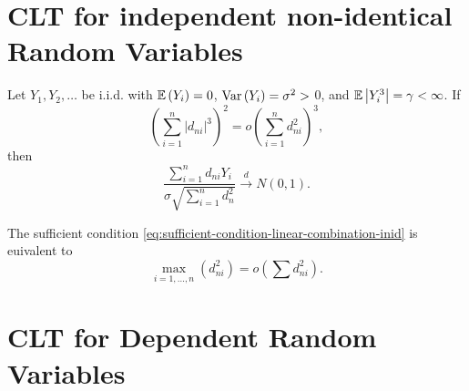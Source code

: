 \section{CLT for independent non-identical Random Variables}

\begin{theorem}
	\label{thm:liapounov-clt}

\end{theorem}

\begin{theorem}
	\label{thm:linear-combination-inid}
	Let $Y_1,Y_2,\ldots$ be i.i.d. with ${\mathbb E}\left(Y_{i}\right)=0$, $\mathrm{Var}\left(Y_{i}\right)=\sigma^2>$ 0, and ${\mathbb E}\left|Y_{i}^3\right|=\gamma<\infty$. If
	\begin{equation}
		\label{eq:sufficient-condition-linear-combination-inid}
		\left(\sum_{i=1}^n\left|d_{ni}\right|^3\right)^2=o\left(\sum_{i=1}^{n}d_{ni}^2\right)^3,
	\end{equation}
	then
	\begin{equation*}
		\frac{\sum_{i=1}^{n}d_{ni}Y_{i}}{\sigma\sqrt{\sum_{i=1}^{n}d_{n }^2}}\stackrel{d}{\rightarrow}N(0,1).
	\end{equation*}
\end{theorem}

\begin{corollary}
	The sufficient condition \eqref{eq:sufficient-condition-linear-combination-inid} is euivalent to
	\begin{equation}
		\max_{i=1,\ldots,n}\left(d_{ni}^2\right)=o\left(\sum d_{ni}^2\right).
	\end{equation}
\end{corollary}

\section{CLT for Dependent Random Variables}
